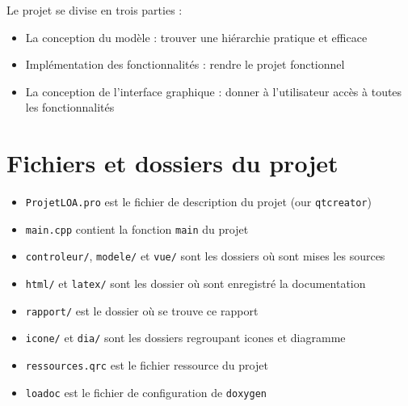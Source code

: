 \documentclass[a4paper,12pt]{report}
\begin{document}
Le projet se divise en trois parties :
\begin{itemize}
	\item La conception du modèle : trouver une hiérarchie pratique et efficace
	\item Implémentation des fonctionnalités : rendre le projet fonctionnel
	\item La conception de l'interface graphique : donner à l'utilisateur accès à toutes les fonctionnalités
\end{itemize}


\section{Fichiers et dossiers du projet}

\begin{itemize}
	\item \texttt{ProjetLOA.pro} est le fichier de description du projet (our \texttt{qtcreator})
	\item \texttt{main.cpp} contient la fonction \texttt{main} du projet
	\item \texttt{controleur/}, \texttt{modele/} et \texttt{vue/} sont les dossiers où sont mises les sources
	\item \texttt{html/} et \texttt{latex/} sont les dossier où sont enregistré la documentation
	\item \texttt{rapport/} est le dossier où se trouve ce rapport
	\item \texttt{icone/} et \texttt{dia/} sont les dossiers regroupant icones et diagramme
	\item \texttt{ressources.qrc} est le fichier ressource du projet
	\item \texttt{loadoc} est le fichier de configuration de \texttt{doxygen}
\end{itemize}
\end{document}
